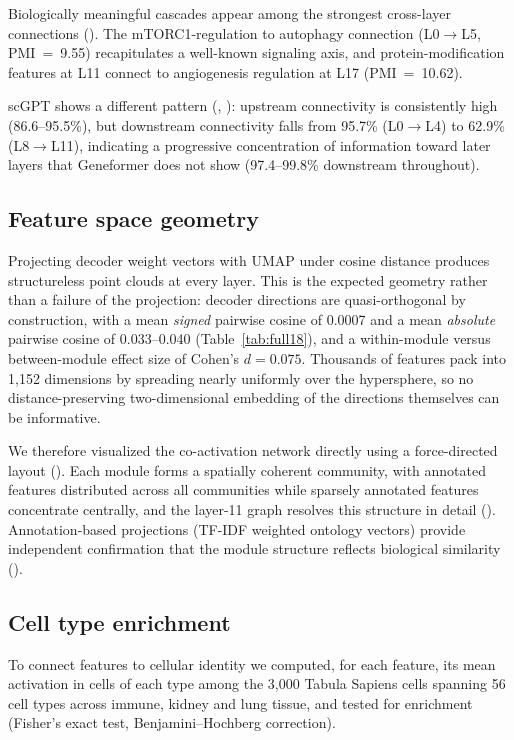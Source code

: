 Biologically meaningful cascades appear among the strongest cross-layer connections
(). The mTORC1-regulation to autophagy connection (L0$\to$L5, PMI~=~9.55) recapitulates a well-known
signaling axis, and protein-modification features at L11 connect to angiogenesis regulation at L17
(PMI~=~10.62).

scGPT shows a different pattern (, ): upstream
connectivity is consistently high (86.6--95.5\%), but
downstream connectivity falls from 95.7\% (L0$\to$L4) to 62.9\% (L8$\to$L11), indicating a
progressive concentration of information toward later layers that Geneformer does not show
(97.4--99.8\% downstream throughout).

\subsection*{Feature space geometry}
\label{sec:geometry}

Projecting decoder weight vectors with UMAP under cosine distance produces structureless point
clouds at every layer. This is the expected geometry rather than a failure of the projection:
decoder directions are quasi-orthogonal by construction, with a mean \emph{signed} pairwise cosine
of 0.0007 and a mean \emph{absolute} pairwise cosine of 0.033--0.040 (Table~\ref{tab:full18}), and
a within-module versus between-module effect size of Cohen's $d = 0.075$. Thousands of features
pack into 1,152 dimensions by spreading nearly uniformly over the hypersphere, so no
distance-preserving two-dimensional embedding of the directions themselves can be informative.

We therefore visualized the co-activation network directly using a force-directed layout
(). Each module forms a spatially coherent community, with annotated
features distributed across all communities while sparsely annotated features concentrate centrally,
and the layer-11 graph resolves this structure in detail (). Annotation-based projections (TF-IDF weighted ontology vectors) provide independent
confirmation that the module structure reflects biological similarity
().

\subsection*{Cell type enrichment}
\label{sec:celltypes}

To connect features to cellular identity we computed, for each feature, its mean activation in
cells of each type among the 3,000 Tabula Sapiens cells spanning 56 cell types across immune,
kidney and lung tissue, and tested for enrichment (Fisher's exact test, Benjamini--Hochberg
correction).

